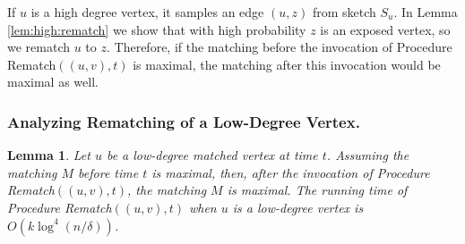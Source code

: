 \documentclass[11pt,letter]{article}
\newtheorem{lemma}[theorem]{Lemma}
\begin{document}
If $u$ is a high degree vertex, it samples an edge $(u,z)$ from sketch $S_u$.
In Lemma \ref{lem:high:rematch} we show that with high probability $z$
is an exposed vertex, so we rematch $u$ to $z$.
Therefore, if the matching before the invocation of
Procedure {\sf Rematch$((u,v),t)$} is maximal, the matching after this
invocation would be maximal as well.

\begin{center}
\end{center}



\subsubsection{Analyzing Rematching of a Low-Degree Vertex.}

\begin{lemma}
\label{lem:low:rematch}
Let $u$ be a low-degree matched vertex at time $t$.
Assuming the matching $M$ before time $t$ is maximal,
then, after the invocation of Procedure {\sf Rematch$((u,v), t)$}, the matching $M$ is maximal.
The running time of Procedure {\sf Rematch$((u,v), t)$}
when $u$ is a low-degree vertex is $O(k\log^4(n/\delta))$.
\end{lemma}
\end{document}
